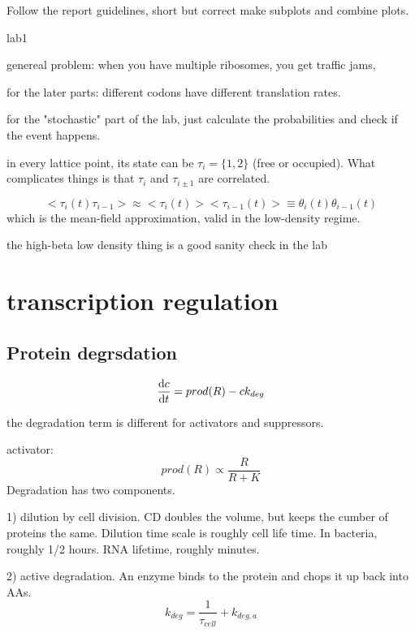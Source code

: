\documentclass{article}
\begin{document}
Follow the report guidelines, short but correct
make subplots and combine plots. 


lab1 

genereal problem: when you have multiple ribosomes, you get traffic jams, 

for the later parts: different codons have different translation rates. 


for the "stochastic" part of the lab, just calculate the probabilities and check if the event happens. 

in every lattice point, its state can be $\tau_i =  \{1,2\}$ (free or occupied). What complicates things is that $\tau_i$ and $\tau_{i\pm 1}$ are correlated. 

\begin{equation}
	<\tau_i(t)\tau_{i-1}>\approx <\tau_i(t)><\tau_{i-1}(t)> \equiv \theta_i(t)\theta_{i-1}(t)
\end{equation}
which is the mean-field approximation, valid in the low-density regime. 

the high-beta low density thing is a good sanity check in the lab


\section{transcription regulation}
\subsection{Protein degrsdation }
\begin{equation}
	\dv{c}{t}  = prod(R) - ck_{deg}
\end{equation}

the degradation term is different for activators and suppressors. 

activator: 
\begin{equation}
	prod(R)\propto \frac{R}{R+ K}
\end{equation}
Degradation has two components. 

1) dilution by cell division. CD doubles the volume, but keeps the cumber of proteins the same. Dilution time scale is roughly cell life time. In bacteria, roughly 1/2 hours. RNA lifetime, roughly minutes. 

2) active degradation. An enzyme binds to the protein and chops it up back into AAs.
\begin{equation}
	k_{deg} = \frac{1}{\tau_{cell}} + k_{deg,a}
\end{equation}
\end{document}
